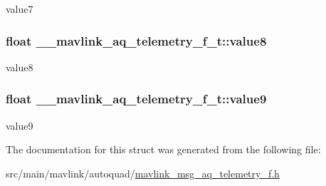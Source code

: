 value7 

\hypertarget{struct____mavlink__aq__telemetry__f__t_a0cc33fb7efca15341abc6c8f1a4db4f1}{
\subsubsection[{value8}]{\setlength{\rightskip}{0pt plus 5cm}float \+\_\+\+\_\+mavlink\+\_\+aq\+\_\+telemetry\+\_\+f\+\_\+t\+::value8}}\label{struct____mavlink__aq__telemetry__f__t_a0cc33fb7efca15341abc6c8f1a4db4f1}


value8 

\hypertarget{struct____mavlink__aq__telemetry__f__t_a659389625b7759b2260015380edfbf35}{
\subsubsection[{value9}]{\setlength{\rightskip}{0pt plus 5cm}float \+\_\+\+\_\+mavlink\+\_\+aq\+\_\+telemetry\+\_\+f\+\_\+t\+::value9}}\label{struct____mavlink__aq__telemetry__f__t_a659389625b7759b2260015380edfbf35}


value9 



The documentation for this struct was generated from the following file\+:\begin{DoxyCompactItemize}
\item 
src/main/mavlink/autoquad/\hyperlink{mavlink__msg__aq__telemetry__f_8h}{mavlink\+\_\+msg\+\_\+aq\+\_\+telemetry\+\_\+f.\+h}\end{DoxyCompactItemize}
